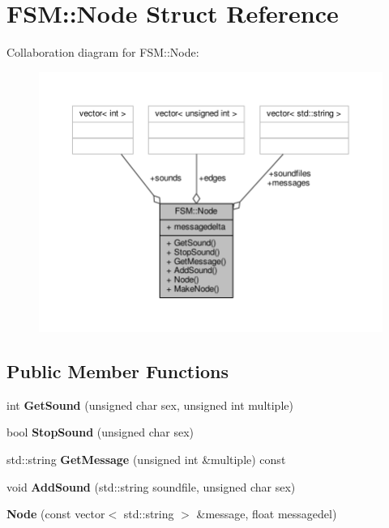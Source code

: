 \hypertarget{structFSM_1_1Node}{}\section{F\+SM\+:\+:Node Struct Reference}
\label{structFSM_1_1Node}


Collaboration diagram for F\+SM\+:\+:Node\+:
\nopagebreak
\begin{figure}[H]
\begin{center}
\leavevmode
\includegraphics[width=350pt]{dc/dfc/structFSM_1_1Node__coll__graph}
\end{center}
\end{figure}
\subsection*{Public Member Functions}
\begin{DoxyCompactItemize}
\item 
int {\bfseries Get\+Sound} (unsigned char sex, unsigned int multiple)\hypertarget{structFSM_1_1Node_aab01fa40d1642833a160919161560573}{}\label{structFSM_1_1Node_aab01fa40d1642833a160919161560573}

\item 
bool {\bfseries Stop\+Sound} (unsigned char sex)\hypertarget{structFSM_1_1Node_a53773f90cb0632834e5a74952088e50a}{}\label{structFSM_1_1Node_a53773f90cb0632834e5a74952088e50a}

\item 
std\+::string {\bfseries Get\+Message} (unsigned int \&multiple) const \hypertarget{structFSM_1_1Node_a82151e9f8d2473edf593bef05177ec88}{}\label{structFSM_1_1Node_a82151e9f8d2473edf593bef05177ec88}

\item 
void {\bfseries Add\+Sound} (std\+::string soundfile, unsigned char sex)\hypertarget{structFSM_1_1Node_a96de008a552cefd29502c40c965581c1}{}\label{structFSM_1_1Node_a96de008a552cefd29502c40c965581c1}

\item 
{\bfseries Node} (const vector$<$ std\+::string $>$ \&message, float messagedel)\hypertarget{structFSM_1_1Node_a7d9b9fd501966f4ca90616735f34642f}{}\label{structFSM_1_1Node_a7d9b9fd501966f4ca90616735f34642f}

\end{DoxyCompactItemize}
